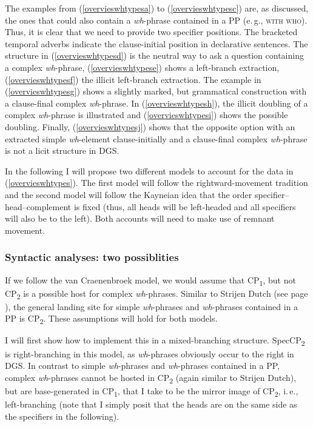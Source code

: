 \noindent The examples from (\ref{overvieswhtypesa}) to (\ref{overvieswhtypesc}) are, as discussed, the ones that could also contain a \textit{wh}-phrase contained in a PP (e.\,g., \textsc{with who}). Thus, it is clear that we need to provide two specifier positions. The bracketed temporal adverbs indicate the clause-initial position in declarative sentences. The structure in (\ref{overvieswhtypesd}) is the neutral way to ask a question containing a complex \textit{wh}-phrase, (\ref{overvieswhtypese}) shows a left-branch extraction, (\ref{overvieswhtypesf}) the illicit left-branch extraction. The example in (\ref{overvieswhtypesg}) shows a slightly marked, but grammatical construction with a clause-final complex \textit{wh}-phrase. In (\ref{overvieswhtypesh}), the illicit doubling of a complex \textit{wh}-phrase is illustrated and (\ref{overvieswhtypesi}) shows the possible doubling. Finally, (\ref{overvieswhtypesj}) shows that the opposite option with an extracted simple \textit{wh}-element clause-initially and a clause-final complex \textit{wh}-phrase is not a licit structure in DGS.


In the following I will propose two different models to account for the data in (\ref{overvieswhtypes}). The first model will follow the rightward-movement tradition and the second model will follow the Kayneian idea that the order specifier--head--complement is fixed (thus, all heads will be left-headed and all specifiers will also be to the left). Both accounts will need to make use of remnant movement.
\vspace{-0.3cm}
\subsubsection{Syntactic analyses: two possiblities}
\vspace{-0.3cm}
If we follow the van Craenenbroek model, we would assume that CP\textsubscript{1}, but not CP\textsubscript{2} is a possible host for complex \textit{wh}-phrases. Similar to Strijen Dutch (see page \pageref{vancraenenbroekdutchdialecta}), the general landing site for simple \textit{wh}-phrases and \textit{wh}-phrases contained in a PP is CP\textsubscript{2}. These assumptions will hold for both models.

I will first show how to implement this in a mixed-branching structure. SpecCP\textsubscript{2} is right-branching in this model, as \textit{wh}-phrases obviously occur to the right in DGS. In contrast to simple \textit{wh}-phrases and \textit{wh}-phrases contained in a PP, complex \textit{wh}-phrases cannot be hosted in CP\textsubscript{2} (again similar to Strijen Dutch), but are base-generated in CP\textsubscript{1}, that I take to be the mirror image of CP\textsubscript{2}, i.\,e., left-branching (note that I simply posit that the heads are on the same side as the specifiers in the following). 

